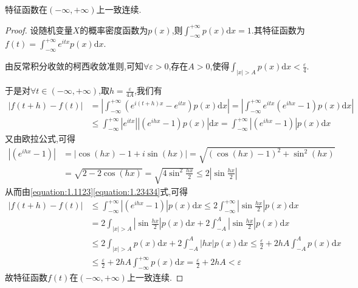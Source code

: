\documentclass[lang=cn,newtx,10pt,scheme=chinese]{../../Template/elegantbook}
\begin{document}
\begin{theorem}[特征函数性质]\label{theorem:特征函数性质}
    特征函数在$(-\infty,+\infty)$上一致连续.
\end{theorem}
\begin{proof}
设随机变量\(X\)的概率密度函数为\(p(x)\),则\(\int_{-\infty}^{+\infty}p(x)\mathrm{d}x = 1\).其特征函数为\(f(t) = \int_{-\infty}^{+\infty}e^{itx}p(x)\mathrm{d}x\).

由反常积分收敛的柯西收敛准则,可知\(\forall \varepsilon > 0\),存在\(A > 0\),使得\(\int_{|x| > A}p(x)\mathrm{d}x < \frac{\varepsilon}{4}\).

于是对\(\forall t \in (-\infty, +\infty)\),取\(h = \frac{\varepsilon}{4A}\),我们有
\begin{equation}\label{equation:1.1123}
\begin{aligned}
|f(t + h) - f(t)| &= \left|\int_{-\infty}^{+\infty}(e^{i(t + h)x} - e^{itx})p(x)\mathrm{d}x\right|
= \left|\int_{-\infty}^{+\infty}e^{itx}(e^{ihx} - 1)p(x)\mathrm{d}x\right|\\
&\leqslant \int_{-\infty}^{+\infty}|e^{itx}||(e^{ihx} - 1)p(x)|\mathrm{d}x
= \int_{-\infty}^{+\infty}|(e^{ihx} - 1)|p(x)\mathrm{d}x
\end{aligned}
\end{equation}
又由欧拉公式,可得
\begin{equation}\label{equation:1.23434}
    \begin{aligned}
|(e^{ihx} - 1)| &= |\cos(hx) - 1 + i\sin(hx)|
= \sqrt{(\cos(hx) - 1)^2 + \sin^2(hx)}\\
&= \sqrt{2 - 2\cos(hx)}
= \sqrt{4\sin^2\frac{hx}{2}} \leqslant 2\left|\sin\frac{hx}{2}\right|
\end{aligned}
\end{equation}
从而由\eqref{equation:1.1123}\eqref{equation:1.23434}式,可得
\begin{align*}
|f(t + h) - f(t)| &\leqslant \int_{-\infty}^{+\infty}|(e^{ihx} - 1)|p(x)\mathrm{d}x
\leqslant 2\int_{-\infty}^{+\infty}\left|\sin\frac{hx}{2}\right|p(x)\mathrm{d}x\\
&= 2\int_{|x| > A}\left|\sin\frac{hx}{2}\right|p(x)\mathrm{d}x + 2\int_{-A}^{A}\left|\sin\frac{hx}{2}\right|p(x)\mathrm{d}x\\
&\leqslant 2\int_{|x| > A}p(x)\mathrm{d}x + 2\int_{-A}^{A}|hx|p(x)\mathrm{d}x
\leqslant \frac{\varepsilon}{2} + 2hA\int_{-A}^{A}p(x)\mathrm{d}x\\
&\leqslant \frac{\varepsilon}{2} + 2hA\int_{-\infty}^{+\infty}p(x)\mathrm{d}x
= \frac{\varepsilon}{2} + 2hA < \varepsilon
\end{align*}
故特征函数\(f(t)\)在\((-\infty, +\infty)\)上一致连续. 
\end{proof}
\end{document}
